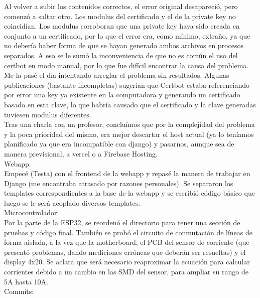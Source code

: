 Al volver a subir los contenidos correctos, el error original desapareció, pero comenzó a saltar otro. Los modulus del certificado y el de la private key no coincidían. Los modulus corroboran que una private key haya sido creada en conjunto a un certificado, por lo que el error era, como mínimo, extraño, ya que no debería haber forma de que se hayan generado ambos archivos en procesos separados. A eso se le sumó la inconveniencia de que no es común el uso del certbot en modo manual, por lo que fue difícil encontrar la causa del problema.\\

Me la pasé el día intentando arreglar el problema sin resultados. Algunas publicaciones (bastante incompletas) sugerían que Certbot estaba referenciando por error una key ya existente en la computadora y generando un certificado basado en esta clave, lo que habría causado que el certificado y la clave generadas tuviesen modulus diferentes.\\

Tras una charla con un profesor, concluímos que por la complejidad del problema y la poca prioridad del mismo, era mejor descartar el host actual (ya lo teníamos planificado ya que era incompatible con django) y pasarnos, aunque sea de manera previsional, a vercel o a Firebase Hosting.\\

Webapp:\\

Empecé (Testa) con el frontend de la webapp y repasé la manera de trabajar en Django (me encontraba atrasado por razones personales). Se separaron los templates correspondientes a la base de la webapp y se escribió código básico que luego se le será acoplado diversos templates.\\

Microcontrolador:\\

Por la parte de la ESP32, se reordenó el directorio para tener una sección de pruebas y código final. También se probó el circuito de conmutación de líneas de forma aislada, a la vez que la motherboard, el PCB del sensor de corriente (que presentó problemas, dando mediciones erróneas que deberán ser resueltas) y el display 4x20. Se aclara que será necesario reaproximar la ecuación para calcular corrientes debido a un cambio en las SMD del sensor, para ampliar su rango de 5A hasta 10A.\\

Commits:\\

